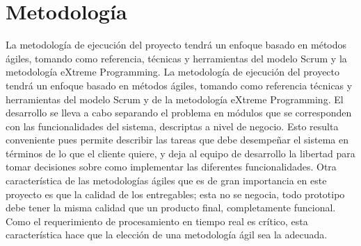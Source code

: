 \section*{Metodología}

La metodología de ejecución del proyecto tendrá un enfoque basado en métodos ágiles, tomando como referencia, técnicas y herramientas del modelo Scrum y la metodología eXtreme Programming. La metodología de ejecución del proyecto tendrá un enfoque basado en métodos ágiles, tomando como referencia técnicas y herramientas del modelo Scrum y de la metodología eXtreme Programming. El desarrollo se lleva a cabo separando el problema en módulos que se corresponden con las funcionalidades del sistema, descriptas a nivel de negocio. Esto resulta conveniente pues permite describir las tareas que debe desempeñar el sistema en términos de lo que el cliente quiere, y deja al equipo de desarrollo la libertad para tomar decisiones sobre como implementar las diferentes funcionalidades. Otra característica de las metodologías ágiles que es de gran importancia en este proyecto es que la calidad de los entregables; esta no se negocia, todo prototipo debe tener la misma calidad que un producto final, completamente funcional. Como el requerimiento de procesamiento en tiempo real es crítico, esta característica hace que la elección de una metodología ágil sea la adecuada.

